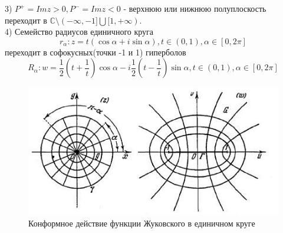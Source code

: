 \documentclass{article}
\begin{document}
	3) ${P}^{+}=Imz>0,{P}^{-}=Imz<0$ - верхнюю или нижнюю полуплоскость переходит в $\mathbb{C}\setminus (-\infty,-1]\bigcup [1,+\infty)$.\\
	4) Семейство радиусов единичного круга 
	\begin{equation}
	{r}_{\alpha}:z=t(\cos \alpha+i\sin \alpha),t\in (0,1),\alpha\in[0,2\pi]
	\end{equation}
	переходит в софокусных(точки -1 и 1) гиперболов
	\begin{equation}
	{R}_{\alpha}:w=\frac{1}{2}(t+\frac{1}{t})\cos \alpha-i\frac{1}{2}(t-\frac{1}{t})\sin \alpha,t\in (0,1),\alpha\in[0,2\pi]
	\end{equation}
	\begin{figure}
		\centering
		\includegraphics[width=0.7\linewidth]{fig1}
		\caption{Конформное действие функции Жуковского в единичном круге}
		\label{fig:fig1}
	\end{figure}
	
\end{document}
